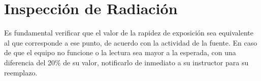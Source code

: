 \section*{Inspección de Radiación}

Es fundamental verificar que el valor de la rapidez de exposición sea equivalente al que corresponde a ese punto, de acuerdo con la actividad de la fuente. En caso de que el equipo no funcione o la lectura sea mayor a la esperada, con una diferencia del 20\% de su valor, notificarlo de inmediato a su instructor para su reemplazo.